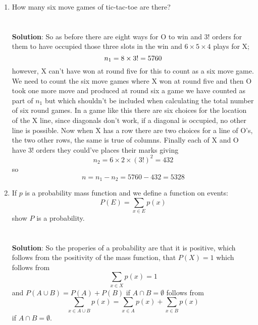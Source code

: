 \documentclass[11pt,a4paper]{scrartcl}
\begin{document}
\begin{enumerate}
\item How many six move games of tic-tac-toe are
  there?\\ \\ \\ \textbf{Solution}: So as before there are eight ways
  for O to win and $3!$ orders for them to have occupied those three
  slots in the win and $6\times 5\times 4$ plays for X;
  \begin{equation}
    n_1=8\times 3! \time 120 =5760
  \end{equation}
  however, X can't have won at round five for this to count as a six
  move game. We need to count the six move games where X won at round
  five and then O took one more move and produced at round six a game
  we have counted as part of $n_1$ but which shouldn't be included
  when calculating the total number of six round games. In a game like
  this there are six choices for the location of the X line, since
  diagonals don't work, if a diagonal is occupied, no other line is
  possible. Now when X has a row there are two choices for a line of
  O's, the two other rows, the same is true of columns. Finally each of X and O have 3! orders they could've places their marks giving
  \begin{equation}
    n_2=6\times 2\times (3!)^2=432
  \end{equation}
  so
  \begin{equation}
    n=n_1-n_2=5760-432=5328
  \end{equation}


\item If $p$ is a probability mass function and we define a function on events:
  \begin{equation}
    P(E)=\sum_{x\in E}p(x)
  \end{equation}
  show $P$ is a probability.\\ \\ \\ \textbf{Solution}: So the
  properies of a probability are that it is positive, which follows
  from the positivity of the mass function, that $P(X)=1$ which
  follows from 
  \begin{equation}
    \sum_{x\in X}p(x)=1
  \end{equation}
  and $P(A\cup B)=P(A)+P(B)$ if $A\cap B=\emptyset$ follows from
    \begin{equation}
    \sum_{x\in A\cup B}p(x)=    \sum_{x\in A}p(x)+    \sum_{x\in B}p(x)
  \end{equation}
  if $A\cap B=\emptyset$.


\end{enumerate}
\end{document}
